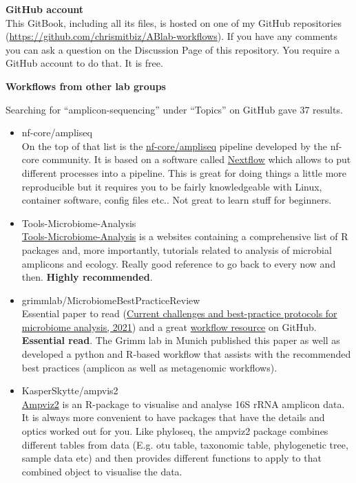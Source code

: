 \documentclass[
]{book}
\begin{document}
\textbf{GitHub account}\\
This GitBook, including all its files, is hosted on one of my GitHub repositories (\url{https://github.com/chrismitbiz/ABlab-workflows}). If you have any comments you can ask a question on the Discussion Page of this repository. You require a GitHub account to do that. It is free.

\textbf{Workflows from other lab groups}

Searching for ``amplicon-sequencing'' under ``Topics'' on GitHub gave 37 results.

\begin{itemize}
\item
  nf-core/ampliseq\\
  On the top of that list is the \href{https://github.com/topics/amplicon-sequencing}{nf-core/ampliseq} pipeline developed by the nf-core community. It is based on a software called \href{https://www.nextflow.io/}{Nextflow} which allows to put different processes into a pipeline. This is great for doing things a little more reproducible but it requires you to be fairly knowledgeable with Linux, container software, config files etc.. Not great to learn stuff for beginners.
\item
  Tools-Microbiome-Analysis\\
  \href{https://microsud.github.io/Tools-Microbiome-Analysis/}{Tools-Microbiome-Analysis} is a websites containing a comprehensive list of R packages and, more importantly, tutorials related to analysis of microbial amplicons and ecology. Really good reference to go back to every now and then. \textbf{Highly recommended}.
\item
  grimmlab/MicrobiomeBestPracticeReview\\
  Essential paper to read (\href{https://academic.oup.com/bib/article/22/1/178/5678919}{Current challenges and best-practice protocols for microbiome analysis, 2021}) and a great \href{https://github.com/grimmlab/MicrobiomeBestPracticeReview}{workflow resource} on GitHub. \textbf{Essential read}. The Grimm lab in Munich published this paper as well as developed a python and R-based workflow that assists with the recommended best practices (amplicon as well as metagenomic workflows).
\item
  KasperSkytte/ampvis2\\
  \href{https://kasperskytte.github.io/ampvis2/articles/ampvis2.html}{Ampviz2} is an R-package to visualise and analyse 16S rRNA amplicon data. It is always more convenient to have packages that have the details and optics worked out for you. Like phyloseq, the ampviz2 package combines different tables from data (E.g. otu table, taxonomic table, phylogenetic tree, sample data etc) and then provides different functions to apply to that combined object to visualise the data.
\end{itemize}
\end{document}
